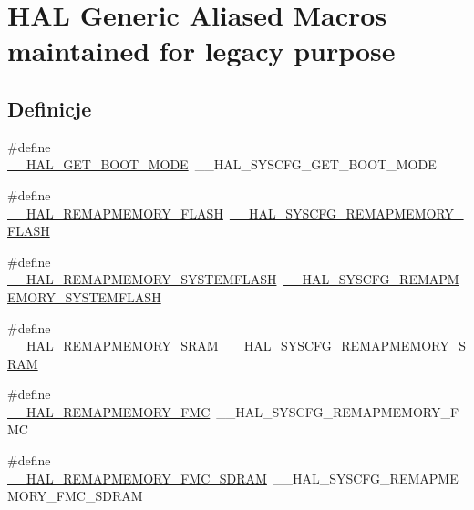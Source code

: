 \hypertarget{group___h_a_l___aliased___macros}{}\section{H\+AL Generic Aliased Macros maintained for legacy purpose}
\label{group___h_a_l___aliased___macros}
\subsection*{Definicje}
\begin{DoxyCompactItemize}
\item 
\#define \hyperlink{group___h_a_l___aliased___macros_ga39fe1e2b6eddc3101d95ffb9f1fdfc03}{\+\_\+\+\_\+\+H\+A\+L\+\_\+\+G\+E\+T\+\_\+\+B\+O\+O\+T\+\_\+\+M\+O\+DE}~\+\_\+\+\_\+\+H\+A\+L\+\_\+\+S\+Y\+S\+C\+F\+G\+\_\+\+G\+E\+T\+\_\+\+B\+O\+O\+T\+\_\+\+M\+O\+DE
\item 
\#define \hyperlink{group___h_a_l___aliased___macros_ga981a56c85b0612c1085c1d84cf879b35}{\+\_\+\+\_\+\+H\+A\+L\+\_\+\+R\+E\+M\+A\+P\+M\+E\+M\+O\+R\+Y\+\_\+\+F\+L\+A\+SH}~\hyperlink{group___h_a_l___exported___macros_ga9500619e1ec21659bd32b1dfecd5afc1}{\+\_\+\+\_\+\+H\+A\+L\+\_\+\+S\+Y\+S\+C\+F\+G\+\_\+\+R\+E\+M\+A\+P\+M\+E\+M\+O\+R\+Y\+\_\+\+F\+L\+A\+SH}
\item 
\#define \hyperlink{group___h_a_l___aliased___macros_ga476dbd120dafe0fbe3e1e090f85d01ae}{\+\_\+\+\_\+\+H\+A\+L\+\_\+\+R\+E\+M\+A\+P\+M\+E\+M\+O\+R\+Y\+\_\+\+S\+Y\+S\+T\+E\+M\+F\+L\+A\+SH}~\hyperlink{group___h_a_l___exported___macros_ga59782d94690fd538b25def536c81c3ed}{\+\_\+\+\_\+\+H\+A\+L\+\_\+\+S\+Y\+S\+C\+F\+G\+\_\+\+R\+E\+M\+A\+P\+M\+E\+M\+O\+R\+Y\+\_\+\+S\+Y\+S\+T\+E\+M\+F\+L\+A\+SH}
\item 
\#define \hyperlink{group___h_a_l___aliased___macros_ga8ac9efd3dae480b2d5d6487ddf0f1750}{\+\_\+\+\_\+\+H\+A\+L\+\_\+\+R\+E\+M\+A\+P\+M\+E\+M\+O\+R\+Y\+\_\+\+S\+R\+AM}~\hyperlink{group___h_a_l___exported___macros_ga86d36fdb1571fd56ffeecfaed80c6805}{\+\_\+\+\_\+\+H\+A\+L\+\_\+\+S\+Y\+S\+C\+F\+G\+\_\+\+R\+E\+M\+A\+P\+M\+E\+M\+O\+R\+Y\+\_\+\+S\+R\+AM}
\item 
\#define \hyperlink{group___h_a_l___aliased___macros_gaa188d9f34a61a5601aefa808e8d3053e}{\+\_\+\+\_\+\+H\+A\+L\+\_\+\+R\+E\+M\+A\+P\+M\+E\+M\+O\+R\+Y\+\_\+\+F\+MC}~\+\_\+\+\_\+\+H\+A\+L\+\_\+\+S\+Y\+S\+C\+F\+G\+\_\+\+R\+E\+M\+A\+P\+M\+E\+M\+O\+R\+Y\+\_\+\+F\+MC
\item 
\#define \hyperlink{group___h_a_l___aliased___macros_ga366da658d4d21e3b2192803ffc1a15f9}{\+\_\+\+\_\+\+H\+A\+L\+\_\+\+R\+E\+M\+A\+P\+M\+E\+M\+O\+R\+Y\+\_\+\+F\+M\+C\+\_\+\+S\+D\+R\+AM}~\+\_\+\+\_\+\+H\+A\+L\+\_\+\+S\+Y\+S\+C\+F\+G\+\_\+\+R\+E\+M\+A\+P\+M\+E\+M\+O\+R\+Y\+\_\+\+F\+M\+C\+\_\+\+S\+D\+R\+AM

\end{DoxyCompactItemize}
